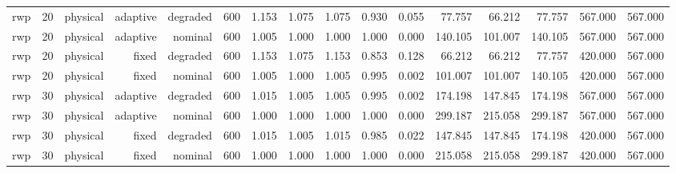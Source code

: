 \begin{tabular}{lrrrrrrrrrrrrrrr}
rwp & 20 & physical & adaptive & degraded & 600 & 1.153 & 1.075 & 1.075 & 0.930 & 0.055 & 77.757 & 66.212 & 77.757 & 567.000 & 567.000 \\
rwp & 20 & physical & adaptive & nominal & 600 & 1.005 & 1.000 & 1.000 & 1.000 & 0.000 & 140.105 & 101.007 & 140.105 & 567.000 & 567.000 \\
rwp & 20 & physical & fixed & degraded & 600 & 1.153 & 1.075 & 1.153 & 0.853 & 0.128 & 66.212 & 66.212 & 77.757 & 420.000 & 567.000 \\
rwp & 20 & physical & fixed & nominal & 600 & 1.005 & 1.000 & 1.005 & 0.995 & 0.002 & 101.007 & 101.007 & 140.105 & 420.000 & 567.000 \\
rwp & 30 & physical & adaptive & degraded & 600 & 1.015 & 1.005 & 1.005 & 0.995 & 0.002 & 174.198 & 147.845 & 174.198 & 567.000 & 567.000 \\
rwp & 30 & physical & adaptive & nominal & 600 & 1.000 & 1.000 & 1.000 & 1.000 & 0.000 & 299.187 & 215.058 & 299.187 & 567.000 & 567.000 \\
rwp & 30 & physical & fixed & degraded & 600 & 1.015 & 1.005 & 1.015 & 0.985 & 0.022 & 147.845 & 147.845 & 174.198 & 420.000 & 567.000 \\
rwp & 30 & physical & fixed & nominal & 600 & 1.000 & 1.000 & 1.000 & 1.000 & 0.000 & 215.058 & 215.058 & 299.187 & 420.000 & 567.000 \\
\bottomrule
\end{tabular}